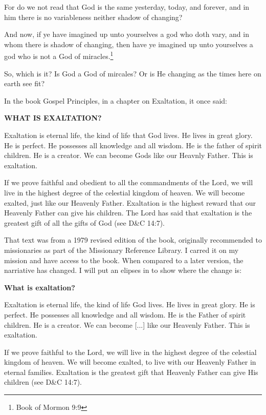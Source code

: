 \begin{displayquote}
For do we not read that God is the same yesterday, today, and forever, and 
in him there is no variableness neither shadow of 
changing?

And now, if ye have imagined up unto yourselves a god who doth vary, and in 
whom there is shadow of changing, then have ye imagined up unto yourselves a 
god who is not a God of miracles.\footnote{Book of Mormon 9:9}
\end{displayquote}

So, which is it? Is God a God of mircales? Or is He changing as the times here
on earth see fit?

In the book Gospel Principles, in a chapter on Exaltation, it once said:

\begin{displayquote}
\textbf{WHAT IS EXALTATION?}

Exaltation is eternal life, the kind of life that God lives. He lives in great
glory. He is perfect. He possesses all knowledge and all wisdom. He is the
father of spirit children. He is a creator. We can become Gods like our Heavnly
Father. This is exaltation.

If we prove faithful and obedient to all the commandments of the Lord, we will
live in the highest degree of the celestial kingdom of heaven. We will become
exalted, just like our Heavenly Father. Exaltation is the highest reward that
our Heavenly Father can give his children. The Lord has said that exaltation
is the greatest gift of all the gifts of 
God (see D\&C 14:7).\cite[pp. 289-290]{gp}
\end{displayquote}

That text was from a 1979 revised edition of the book, originally recommended
to missionaries as part of the Missionary Reference Library. I carred it on 
my mission and have access to the book. When compared to a later version, 
the narriative has changed. I will put an elipses in to show where the 
change is:

\begin{displayquote}
\textbf{What is exaltation?}

Exaltation is eternal life, the kind of life God lives. He lives in great glory. 
He is perfect. He possesses all knowledge and all wisdom. He is the 
Father of spirit children. He is a creator. We can become [...] like our 
Heavenly Father. This is exaltation.

If we prove faithful to the Lord, we will live in the highest degree of the 
celestial kingdom of heaven. We will become exalted, to live with our 
Heavenly Father in eternal families. Exaltation is the greatest gift that 
Heavenly Father can give His children (see D\&C 14:7).\cite[275-280]{gp2}
\end{displayquote}

